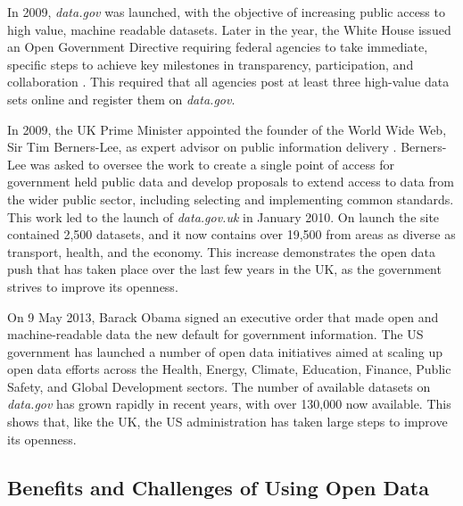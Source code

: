 \documentclass[authoryearcitations]{UoYCSproject}
\begin{document}
In 2009, \textit{data.gov} was launched, with the objective of increasing public access to high value, machine readable datasets. Later in the year, the White House issued an Open Government Directive requiring federal agencies to take immediate, specific steps to achieve key milestones in transparency, participation, and collaboration \citep{Orszag2009}. This required that all agencies post at least three high-value data sets online and register them on \textit{data.gov}.

In 2009, the UK Prime Minister appointed the founder of the World Wide Web, Sir Tim Berners-Lee, as expert advisor on public information delivery \citep{CabinetOffice2009}. Berners-Lee was asked to oversee the work to create a single point of access for government held public data and develop proposals to extend access to data from the wider public sector, including selecting and implementing common standards. This work led to the launch of \textit{data.gov.uk} in January 2010. On launch the site contained 2,500 datasets, and it now contains over 19,500 from areas as diverse as transport, health, and the economy. This increase demonstrates the open data push that has taken place over the last few years in the UK, as the government strives to improve its openness.

On 9 May 2013, Barack Obama signed an executive order \citep{TheWhiteHouse-OfficeofthePressSecretary2013} that made open and machine-readable data the new default for government information. The US government has launched a number of open data initiatives aimed at scaling up open data efforts across the Health, Energy, Climate, Education, Finance, Public Safety, and Global Development sectors. The number of available datasets on \textit{data.gov} has grown rapidly in recent years, with over 130,000 now available. This shows that, like the UK, the US administration has taken large steps to improve its openness.





\subsection{Benefits and Challenges of Using Open Data}
\end{document}
